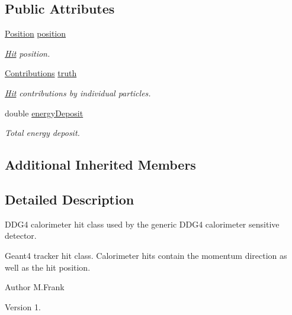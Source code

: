 \subsection*{Public Attributes}
\begin{DoxyCompactItemize}
\item 
\hyperlink{namespace_d_d4hep_1_1_geometry_a55083902099d03506c6db01b80404900}{Position} \hyperlink{class_d_d4hep_1_1_simulation_1_1_geant4_calorimeter_1_1_hit_acab4633ca2b899307b1bbb47a22f0e74}{position}
\begin{DoxyCompactList}\small\item\em \hyperlink{class_d_d4hep_1_1_simulation_1_1_geant4_calorimeter_1_1_hit}{Hit} position. \end{DoxyCompactList}\item 
\hyperlink{class_d_d4hep_1_1_simulation_1_1_geant4_hit_data_aee3759a12612c2f2712e44f87e343a2f}{Contributions} \hyperlink{class_d_d4hep_1_1_simulation_1_1_geant4_calorimeter_1_1_hit_a7e22969405a034dc2f0deb3df1606d0d}{truth}
\begin{DoxyCompactList}\small\item\em \hyperlink{class_d_d4hep_1_1_simulation_1_1_geant4_calorimeter_1_1_hit}{Hit} contributions by individual particles. \end{DoxyCompactList}\item 
double \hyperlink{class_d_d4hep_1_1_simulation_1_1_geant4_calorimeter_1_1_hit_a5d9a6b22529494a8b8e4a9f3f8df9162}{energy\+Deposit}
\begin{DoxyCompactList}\small\item\em Total energy deposit. \end{DoxyCompactList}\end{DoxyCompactItemize}
\subsection*{Additional Inherited Members}


\subsection{Detailed Description}
D\+D\+G4 calorimeter hit class used by the generic D\+D\+G4 calorimeter sensitive detector. 

Geant4 tracker hit class. Calorimeter hits contain the momentum direction as well as the hit position.

\begin{DoxyAuthor}{Author}
M.\+Frank 
\end{DoxyAuthor}
\begin{DoxyVersion}{Version}
1. 
\end{DoxyVersion}


